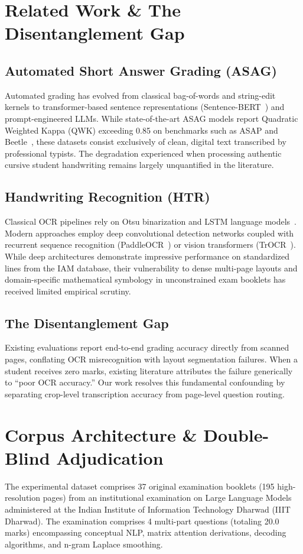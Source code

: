 \documentclass[journal]{IEEEtran}
\begin{document}
\section{Related Work \& The Disentanglement Gap}
\subsection{Automated Short Answer Grading (ASAG)}
Automated grading has evolved from classical bag-of-words and string-edit kernels to transformer-based sentence representations (Sentence-BERT~\cite{reimers2019sentencebert}) and prompt-engineered LLMs. While state-of-the-art ASAG models report Quadratic Weighted Kappa (QWK) exceeding 0.85 on benchmarks such as ASAP and Beetle~\cite{burrows2015erasag, meurers2011short}, these datasets consist exclusively of clean, digital text transcribed by professional typists. The degradation experienced when processing authentic cursive student handwriting remains largely unquantified in the literature.

\subsection{Handwriting Recognition (HTR)}
Classical OCR pipelines rely on Otsu binarization and LSTM language models~\cite{smith2007overview}. Modern approaches employ deep convolutional detection networks coupled with recurrent sequence recognition (PaddleOCR~\cite{du2020ppocr}) or vision transformers (TrOCR~\cite{li2023trocr}). While deep architectures demonstrate impressive performance on standardized lines from the IAM database, their vulnerability to dense multi-page layouts and domain-specific mathematical symbology in unconstrained exam booklets has received limited empirical scrutiny.

\subsection{The Disentanglement Gap}
Existing evaluations report end-to-end grading accuracy directly from scanned pages, conflating OCR misrecognition with layout segmentation failures. When a student receives zero marks, existing literature attributes the failure generically to ``poor OCR accuracy.'' Our work resolves this fundamental confounding by separating crop-level transcription accuracy from page-level question routing.

\section{Corpus Architecture \& Double-Blind Adjudication}
The experimental dataset comprises 37 original examination booklets (195 high-resolution pages) from an institutional examination on Large Language Models administered at the Indian Institute of Information Technology Dharwad (IIIT Dharwad). The examination comprises 4 multi-part questions (totaling 20.0 marks) encompassing conceptual NLP, matrix attention derivations, decoding algorithms, and n-gram Laplace smoothing.
\end{document}
